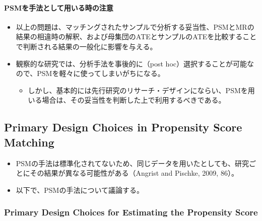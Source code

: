 \paragraph{PSMを手法として用いる時の注意}

\begin{itemize}
 \item 以上の問題は、マッチングされたサンプルで分析する妥当性、PSMとMRの結果の相違時の解釈、および母集団のATEとサンプルのATEを比較することで判断される結果の一般化に影響を与える。
 \item 観察的な研究では、分析手法を事後的に（post hoc）選択することが可能なので、PSMを軽々に使ってしまいがちになる。
  \begin{itemize}
   \item しかし、基本的には先行研究のリサーチ・デザインにならい、PSMを用いる場合は、その妥当性を判断した上で利用するべきである。
  \end{itemize}
\end{itemize}

\subsection*{Primary Design Choices in Propensity Score Matching}

\begin{itemize}
 \item PSMの手法は標準化されてないため、同じデータを用いたとしても、研究ごとにその結果が異なる可能性がある（Angrist and Pischke, 2009, 86）。
 \item 以下で、PSMの手法について議論する。
\end{itemize}

\subsubsection*{Primary Design Choices for Estimating the Propensity Score}

